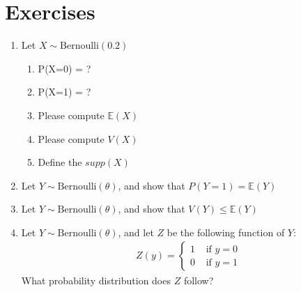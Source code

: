 \ex 



\section{Exercises}

\begin{enumerate}
    \item Let $X \sim \text{Bernoulli}(0.2)$
    \begin{enumerate}
        \item P(X=0) = ?
        \item P(X=1) = ?
        \item Please compute $\mathbb{E}(X)$
        \item Please compute $V(X)$
        \item Define the $supp(X)$
    \end{enumerate}
    
    \item Let $Y \sim \text{Bernoulli}(\theta)$, and 
    show that $P(Y=1) = \mathbb{E}(Y)$

    \item Let $Y \sim \text{Bernoulli}(\theta)$, and 
    show that $V(Y) \leq \mathbb{E}(Y)$
    
    \item Let $Y \sim \text{Bernoulli}(\theta)$, and let $Z$ be the following function of $Y$:
    \begin{align}
        Z(y) = \begin{cases}
                1 & \text{ if } y = 0\\
                0 & \text{ if } y = 1
            \end{cases}
    \end{align}
    What probability distribution does $Z$ follow?
\end{enumerate}


